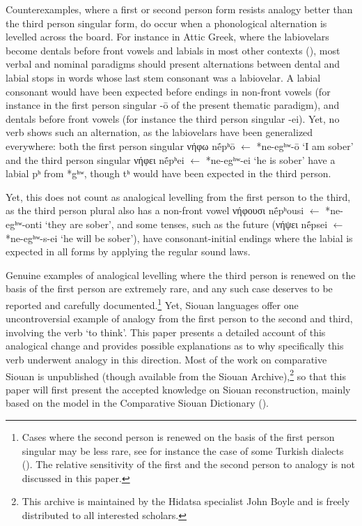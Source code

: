\documentclass[oneside,a4paper,11pt]{article}
\newcommand{\ipa}[1]{{\phon#1}} %
\newcommand{\grec}[1]{{\mleccha #1}}
\begin{document}
Counterexamples, where a first or second person form resists analogy better than the third person singular form, do occur when a phonological alternation is levelled across the board. For instance in Attic Greek,  where  the labiovelars become dentals before front vowels and labials in most other contexts (\citealt[253]{fortson10intro}), most verbal and nominal paradigms should present alternations between dental and labial stops in words whose last stem consonant was a labiovelar. A labial consonant would have been expected before endings in non-front vowels (for instance in the  first person singular \ipa{-ō} of the present thematic paradigm), and  dentals before front vowels (for instance the third person singular \ipa{-ei}). Yet, no  verb shows such an alternation, as the labiovelars have been generalized everywhere:  both the first person singular \grec{νήφω} \ipa{nḗpʰō}  $\leftarrow $ *\ipa{ne-egʰʷ-ō} `I am sober' and the third person singular \grec{νήφει} \ipa{nḗpʰei}  $\leftarrow $ *\ipa{ne-egʰʷ-ei} `he is sober' have a labial \ipa{pʰ} from *\ipa{gʰʷ}, though \ipa{tʰ} would have been expected in the third person. 

Yet, this does not count as analogical levelling from the first person to the third, as the third person plural also has a non-front vowel \grec{νήφουσι} \ipa{nḗpʰousi}  $\leftarrow $ *\ipa{ne-egʰʷ-onti} `they are sober', and some tenses, such as the future (\grec{νήψει} \ipa{nḗpsei} $\leftarrow $ *\ipa{ne-egʰʷ-s-ei} `he will be sober'), have consonant-initial endings where the labial is expected in all forms by applying the regular sound laws.

Genuine examples of analogical levelling where the third person is renewed on the basis of the first person are extremely rare, and any such case deserves to be reported and carefully documented.\footnote{Cases where the second person is renewed on the basis of the first person singular may be less rare, see for instance the case of some Turkish dialects (\citealt{saygin02reanalysis}). The relative sensitivity of the first and the second person to analogy is not discussed in this paper.}  Yet, Siouan languages offer one uncontroversial example  of analogy from the first person to the second and third,  involving the verb `to think'. This paper presents a detailed account of this analogical change and provides possible explanations as to why specifically this verb underwent analogy in this direction. Most of the work on comparative Siouan is unpublished (though available from the Siouan Archive),\footnote{This archive is maintained by the Hidatsa specialist John Boyle and  is freely distributed to all interested scholars.} so that this paper will first present the accepted knowledge on Siouan reconstruction, mainly based on the model in the Comparative Siouan Dictionary (\citealt{rankin15csd}). 
\end{document}
